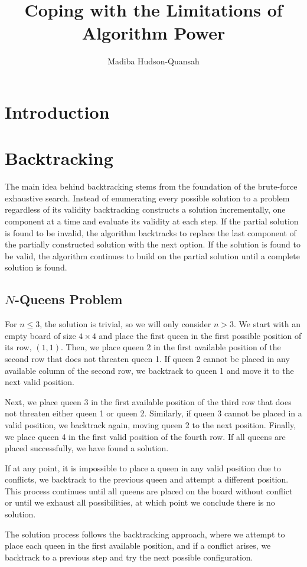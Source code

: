 \documentclass[12pt letter]{report}
\title{\Huge{Coping with the Limitations of Algorithm Power}}
\author{\huge{Madiba Hudson-Quansah}}
\date{}
\begin{document}
\maketitle
\newpage
{}
\tableofcontents
\pagebreak

\chapter{Introduction}

\chapter{Backtracking}

The main idea behind backtracking stems from the foundation of the brute-force exhaustive search. Instead of enumerating
every possible solution to a problem regardless of its validity backtracking constructs a solution incrementally, one
component at a time and evaluate its validity at each step. If the partial solution is found to be invalid, the
algorithm backtracks to replace the last component of the partially constructed solution with the next option. If the
solution is found to be valid, the algorithm continues to build on the partial solution until a complete solution is found.

\section{ $N$-Queens Problem}


For $n \leq 3$, the solution is trivial, so we will only consider $n > 3$. We start with an empty board of size $4 \times 4$ and place the first queen in the first possible position of its row, $(1, 1)$. Then, we place queen 2 in the first available position of the second row that does not threaten queen 1. If queen 2 cannot be placed in any available column of the second row, we backtrack to queen 1 and move it to the next valid position.

Next, we place queen 3 in the first available position of the third row that does not threaten either queen 1 or queen 2. Similarly, if queen 3 cannot be placed in a valid position, we backtrack again, moving queen 2 to the next position. Finally, we place queen 4 in the first valid position of the fourth row. If all queens are placed successfully, we have found a solution.

If at any point, it is impossible to place a queen in any valid position due to conflicts, we backtrack to the previous queen and attempt a different position. This process continues until all queens are placed on the board without conflict or until we exhaust all possibilities, at which point we conclude there is no solution.

The solution process follows the backtracking approach, where we attempt to place each queen in the first available position, and if a conflict arises, we backtrack to a previous step and try the next possible configuration.
\end{document}
